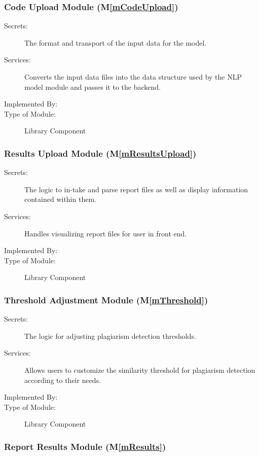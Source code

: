 \documentclass[12pt, titlepage]{article}
\newcommand{\mref}[1]{M\ref{#1}}
\begin{document}
\subsubsection{Code Upload Module (\mref{mCodeUpload})}

\begin{description}
\item[Secrets:] The format and transport of the input data for the model.
\item[Services:] Converts the input data files into the data structure
used by the NLP model module and passes it to the backend.
\item[Implemented By:] \progname{}
\item[Type of Module:] Library Component
\end{description}

\subsubsection{Results Upload Module (\mref{mResultsUpload})}

\begin{description}
\item[Secrets:] The logic to in-take and parse report files as well as display 
information contained within them.
\item[Services:] Handles visualizing report files for user in front end.
\item[Implemented By:] \progname
\item[Type of Module:] Library Component
\end{description}

\subsubsection{Threshold Adjustment Module (\mref{mThreshold})}

\begin{description}
\item[Secrets:] The logic for adjusting plagiarism detection thresholds.
\item[Services:] Allows users to customize the similarity threshold for 
plagiarism detection according to their needs.
\item[Implemented By:] \progname{}
\item[Type of Module:] Library Component
\end{description}

\subsubsection{Report Results Module (\mref{mResults})}
\end{document}
